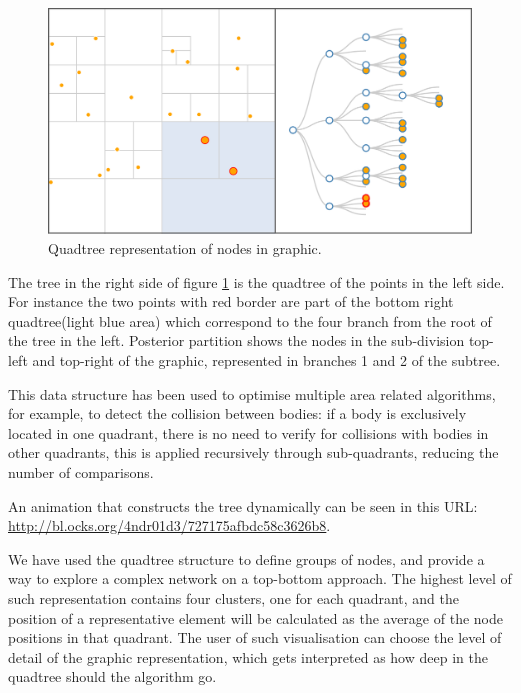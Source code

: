 \begin{figure}[ht]
\centering
\includegraphics[width=\textwidth]{figures/quadtree.png}
\caption[Quadtree representation of nodes in graphic.]{Quadtree representation of nodes in graphic. 
\label{fig:quadtree}}
\end{figure}

The tree in the right side of figure \ref{fig:quadtree} is the quadtree of the points in the left side. For instance the two points with red border are part of the bottom right quadtree(light blue area) which correspond to the four branch from the root of the tree in the left. Posterior partition shows the nodes in the sub-division top-left and top-right of the graphic, represented in branches 1 and 2 of the subtree.

This data structure has been used to optimise multiple area related algorithms, for example, to detect the collision between bodies: if a body is exclusively located in one quadrant, there is no need to verify for collisions with bodies in other quadrants, this is applied recursively through sub-quadrants, reducing the number of comparisons.

An animation that constructs the tree dynamically can be seen in this URL: \url{http://bl.ocks.org/4ndr01d3/727175afbdc58c3626b8}.

We have used the quadtree structure to define groups of nodes, and provide a way to explore a complex network on a top-bottom approach. The highest level of such representation contains four clusters, one for each quadrant, and the position of a representative element will be calculated as the average of the node positions in that quadrant. The user of such visualisation can choose the level of detail of the graphic representation, which gets interpreted as how deep in the quadtree should the algorithm go.

